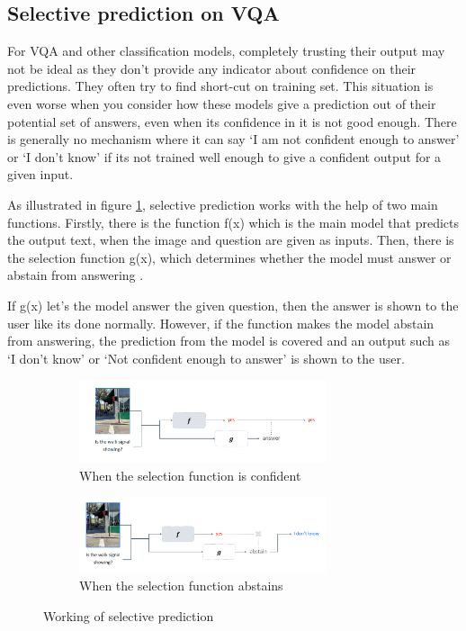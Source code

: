 \documentclass[
	english,
	accentcolor=8b,
	type=intern,
	marginpar=false
	]{tudapub}
\begin{document}
\subsection{Selective prediction on VQA}
For VQA and other classification models, completely trusting their output may not be ideal as they don't provide any indicator about confidence on their predictions. They often try to find short-cut on training set. This situation is even worse when you consider how these models give a prediction out of their potential set of answers, even when its confidence in it is not good enough. There is generally no mechanism where it can say ‘I am not confident enough to answer’ or ‘I don’t know’ if its not trained well enough to give a confident output for a given input. \par
As illustrated in figure \ref{fig:selective_pred}, selective prediction works with the help of two main functions. Firstly, there is the function f(x) which is the main model that predicts the output text, when the image and question are given as inputs. Then, there is the selection function g(x), which determines whether the model must answer or abstain from answering \cite{whitehead2022reliablevisualquestionanswering}. \par
If g(x) let’s the model answer the given question, then the answer is shown to the user like its done normally. However, if the function makes the model abstain from answering, the prediction from the model is covered and an output such as ‘I don’t know’ or ‘Not confident enough to answer’ is shown to the user. \par
\begin{figure}[h]
\centering
\begin{subfigure}{.48\textwidth}
\centering
\includegraphics[width=0.8\textwidth]{figures/confidentv3.png}
\caption{When the selection function is confident}
\end{subfigure} \hfill
\begin{subfigure}{.48\textwidth}
\centering
\includegraphics[width=0.8\textwidth]{figures/abstainv3.png}
\caption{When the selection function abstains}
\end{subfigure} \hfill
\caption{Working of selective prediction \cite{QuantificationLecture}} 
\label{fig:selective_pred}
\end{figure}
\end{document}
